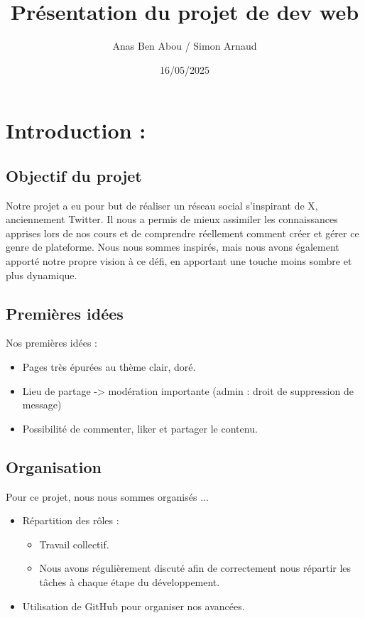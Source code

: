 \documentclass[12pt,a4paper]{article}
\title{Présentation du projet de dev web} %
\author{Anas Ben Abou / Simon Arnaud} %
\date{16/05/2025} %
\begin{document}
\maketitle

\tableofcontents

\newpage

\section{Introduction :}
\subsection{Objectif du projet}
  Notre projet a eu pour but de réaliser un réseau social s'inspirant de X, anciennement Twitter.
  Il nous a permis de mieux assimiler les connaissances apprises lors de nos cours et de comprendre réellement comment créer et gérer ce genre de plateforme. Nous nous sommes inspirés, mais nous avons également apporté notre propre vision à ce défi, en apportant une touche moins sombre et plus dynamique.\\
  
  
\subsection{Premières idées}
  Nos premières idées :
  \begin{itemize}
  \item Pages très épurées au thème clair, doré.
  \item Lieu de partage -> modération importante (admin : droit de suppression de message)
  \item Possibilité de commenter, liker et partager le contenu.
  \end{itemize}
  

\subsection{Organisation}
  Pour ce projet, nous nous sommes organisés ...
  \begin{itemize}
  \item Répartition des rôles :
      \begin{itemize}
      \item Travail collectif. 
      \item Nous avons régulièrement discuté afin de correctement nous répartir les tâches à chaque étape du développement.
      \end{itemize}
  \item Utilisation de GitHub pour organiser nos avancées.
  \end{itemize}
\end{document}
